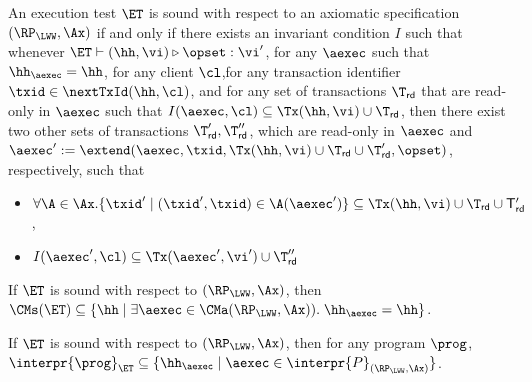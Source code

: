 \begin{definition}
\label{def:et_sound}
An execution test $\ET$ is sound with respect to an axiomatic 
specification $(\RP_{\LWW}, \Ax)$ if and only if there exists an 
invariant condition $I$ such that whenever $\ET \vdash (\hh, \vi) 
\triangleright \opset: \vi'$, for any $\aexec$ such that 
$\hh_{\aexec} = \hh$,  for any client $\cl$,for any 
transaction identifier $\txid \in \nextTxId(\hh, \cl)$, 
and for any set of transactions $\T_{\mathsf{rd}}$ that are 
read-only in $\aexec$ such that  $I(\aexec, \cl) \subseteq \Tx(\hh, \vi) \cup \T_{\mathsf{rd}}$, then  
there exist two other sets of transactions $\T'_{\mathsf{rd}}, \T''_{\mathsf{rd}}$, 
which are read-only in $\aexec$ and $\aexec' := \extend(\aexec, \txid, 
\Tx(\hh,\vi) \cup \T_{\mathsf{rd}} \cup \T'_{\mathsf{rd}}, \opset)$, respectively, such that 
\begin{itemize}
\item $\forall \A \in \Ax. \{\txid' \mid (\txid', \txid) \in \A(\aexec')\} \subseteq \Tx(\hh, \vi) \cup \T_{\mathsf{rd}} \cup \mathsf{T}'_{\mathsf{rd}}$, 
\item $I(\aexec', \cl) \subseteq \Tx(\aexec', \vi') \cup \T''_{\mathsf{rd}}$
\end{itemize}
\end{definition}

\begin{theorem}
\label{thm:et_soundness}
If $\ET$ is sound with respect to $(\RP_{\LWW}, \Ax)$, then 
$\CMs(\ET) \subseteq \{ \hh \mid \exists \aexec \in \CMa(\RP_{\LWW}, \Ax)).\;\hh_{\aexec} = \hh\}$.
\end{theorem}

\begin{corollary}
\label{thm:et_soundness}
If $\ET$ is sound with respect to $(\RP_{\LWW}, \Ax)$, then 
for any program $\prog$, $\interpr{\prog}_{\ET} \subseteq \{ \hh_{\aexec} \mid \aexec \in \interpr{P}_{(\RP_{\LWW}, \Ax)} \}$.
\end{corollary}

